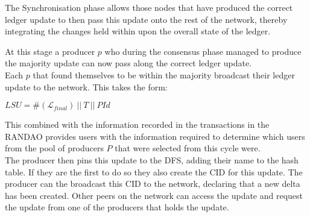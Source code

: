 The Synchronisation phase allows those nodes that have produced the correct ledger update to then pass this update onto the rest of the network, thereby integrating the changes held within upon the overall state of the ledger.

At this stage a producer $p$ who during the consensus phase managed to produce the majority update can now pass along the correct ledger update. \\

Each $p$ that found themselves to be within the majority broadcast their ledger update to the network. This takes the form: 

\begin{center} 
$LSU = \#(\mathcal{L}_{final})~||~T~||~PId$
\end{center} 

This combined with the information recorded in the transactions in the RANDAO provides users with the information required to determine which users from the pool of producers $P$ that were selected from this cycle were. \\

The producer then pins this update to the DFS, adding their name to the hash table. If they are the first to do so they also create the CID for this update. The producer can the broadcast this CID to the network, declaring that a new delta has been created. Other peers on the network can access the update and request the update from one of the producers that holds the update.

